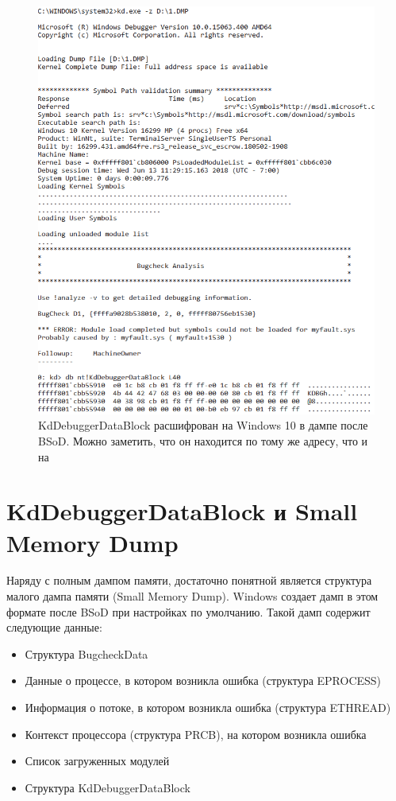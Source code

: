\documentclass{mipt-thesis-bs}
\begin{document}
\begin{figure}[h]
\begin{center}
    \captionsetup{justification=centering}
    \includegraphics[width=1\textwidth]{kd1.png}
    \caption{KdDebuggerDataBlock расшифрован на Windows 10 в дампе после BSoD. Можно заметить, что он находится по тому же адресу, что и на }
    \label{fig:kd2}
\end{center}
\end{figure}

\section*{KdDebuggerDataBlock и Small Memory Dump}

Наряду с полным дампом памяти, достаточно понятной является структура малого дампа памяти (Small Memory Dump). Windows создает дамп в этом формате после BSoD при настройках по умолчанию. Такой дамп содержит следующие данные:

\begin{itemize}
    \item Структура BugcheckData
    \item Данные о процессе, в котором возникла ошибка (структура EPROCESS)
    \item Информация о потоке, в котором возникла ошибка (структура ETHREAD)
    \item Контекст процессора (структура PRCB), на котором возникла ошибка
    \item Список загруженных модулей
    \item Структура KdDebuggerDataBlock
\end{itemize}
\end{document}
